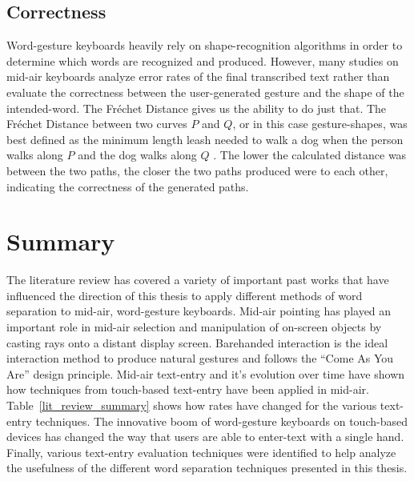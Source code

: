 \subsection{Correctness}
Word-gesture keyboards heavily rely on shape-recognition algorithms in order to determine which words are recognized and produced. However, many studies on mid-air keyboards analyze error rates of the final transcribed text rather than evaluate the correctness between the user-generated gesture and the shape of the intended-word. The Fr\'echet Distance gives us the ability to do just that. The Fr\'echet Distance between two curves $P$ and $Q$, or in this case gesture-shapes, was best defined as the minimum length leash needed to walk a dog when the person walks along $P$ and the dog walks along $Q$ \cite{ref_frechet}. The lower the calculated distance was between the two paths, the closer the two paths produced were to each other, indicating the correctness of the generated paths.

\section{Summary}
The literature review has covered a variety of important past works that have influenced the direction of this thesis to apply different methods of word separation to mid-air, word-gesture keyboards. Mid-air pointing has played an important role in mid-air selection and manipulation of on-screen objects by casting rays onto a distant display screen. Barehanded interaction is the ideal interaction method to produce natural gestures and follows the ``Come As You Are'' design principle. Mid-air text-entry and it's evolution over time have shown how techniques from touch-based text-entry have been applied in mid-air. Table~\ref{lit_review_summary} shows how rates have changed for the various text-entry techniques. The innovative boom of word-gesture keyboards on touch-based devices has changed the way that users are able to enter-text with a single hand. Finally, various text-entry evaluation techniques were identified to help analyze the usefulness of the different word separation techniques presented in this thesis.

